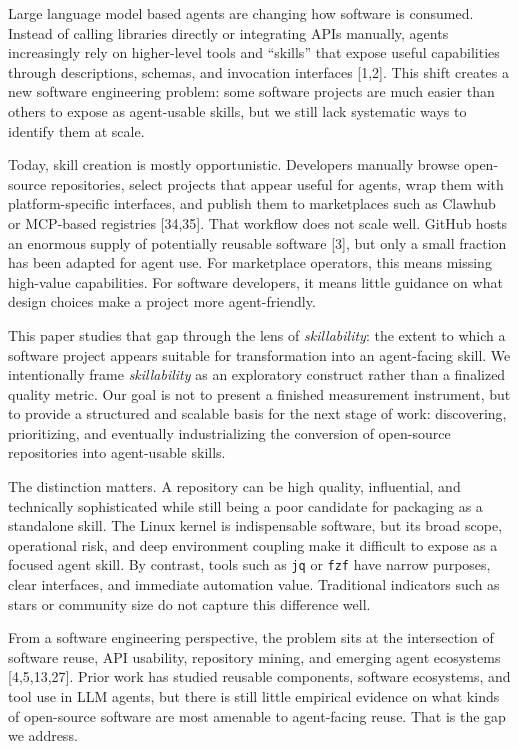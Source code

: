 \documentclass[sigconf,review,anonymous,nonacm]{acmart}
\newcommand{\skillability}{\textit{skillability}\xspace}
\begin{document}
Large language model based agents are changing how software is consumed. Instead of calling libraries directly or integrating APIs manually, agents increasingly rely on higher-level tools and ``skills'' that expose useful capabilities through descriptions, schemas, and invocation interfaces [1,2]. This shift creates a new software engineering problem: some software projects are much easier than others to expose as agent-usable skills, but we still lack systematic ways to identify them at scale.

Today, skill creation is mostly opportunistic. Developers manually browse open-source repositories, select projects that appear useful for agents, wrap them with platform-specific interfaces, and publish them to marketplaces such as Clawhub or MCP-based registries [34,35]. That workflow does not scale well. GitHub hosts an enormous supply of potentially reusable software [3], but only a small fraction has been adapted for agent use. For marketplace operators, this means missing high-value capabilities. For software developers, it means little guidance on what design choices make a project more agent-friendly.

This paper studies that gap through the lens of \skillability: the extent to which a software project appears suitable for transformation into an agent-facing skill. We intentionally frame \skillability as an exploratory construct rather than a finalized quality metric. Our goal is not to present a finished measurement instrument, but to provide a structured and scalable basis for the next stage of work: discovering, prioritizing, and eventually industrializing the conversion of open-source repositories into agent-usable skills.

The distinction matters. A repository can be high quality, influential, and technically sophisticated while still being a poor candidate for packaging as a standalone skill. The Linux kernel is indispensable software, but its broad scope, operational risk, and deep environment coupling make it difficult to expose as a focused agent skill. By contrast, tools such as \texttt{jq} or \texttt{fzf} have narrow purposes, clear interfaces, and immediate automation value. Traditional indicators such as stars or community size do not capture this difference well.

From a software engineering perspective, the problem sits at the intersection of software reuse, API usability, repository mining, and emerging agent ecosystems [4,5,13,27]. Prior work has studied reusable components, software ecosystems, and tool use in LLM agents, but there is still little empirical evidence on what kinds of open-source software are most amenable to agent-facing reuse. That is the gap we address.
\end{document}

